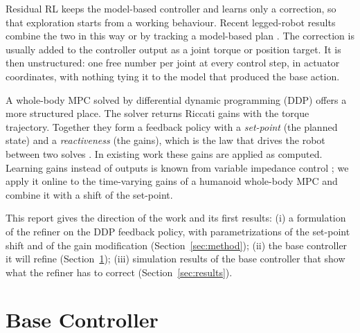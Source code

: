 \documentclass[conference]{IEEEtran}
\begin{document}
Residual RL \cite{johannink2019residual} keeps the model-based controller and learns only a correction, so that exploration starts from a working behaviour.
Recent legged-robot results combine the two in this way or by tracking a model-based plan \cite{jenelten2024dtc,jeon2025residualmpc}.
The correction is usually added to the controller output as a joint torque or position target.
It is then unstructured: one free number per joint at every control step, in actuator coordinates, with nothing tying it to the model that produced the base action.

A whole-body MPC solved by differential dynamic programming (DDP) \cite{mayne1966ddp} offers a more structured place.
The solver returns Riccati gains with the torque trajectory.
Together they form a feedback policy with a \emph{set-point} (the planned state) and a \emph{reactiveness} (the gains), which is the law that drives the robot between two solves \cite{grandia2019feedback,dantec2022firstorder}.
In existing work these gains are applied as computed.
Learning gains instead of outputs is known from variable impedance control \cite{buchli2011variable}; we apply it online to the time-varying gains of a humanoid whole-body MPC and combine it with a shift of the set-point.

This report gives the direction of the work and its first results:
(i) a formulation of the refiner on the DDP feedback policy, with parametrizations of the set-point shift and of the gain modification (Section~\ref{sec:method});
(ii) the base controller it will refine (Section~\ref{sec:base});
(iii) simulation results of the base controller that show what the refiner has to correct (Section~\ref{sec:results}).

\section{Base Controller}
\label{sec:base}
\end{document}

